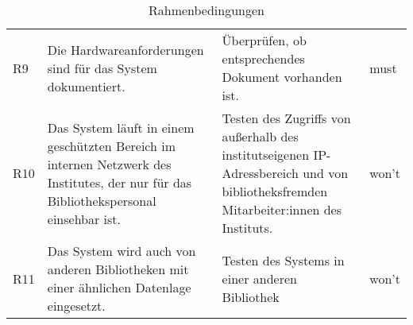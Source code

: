 \begin{table}[h]
\begin{adjustbox}{max width=\textwidth}
\begin{tabular}{lp{7.5cm}p{7.5cm}l}
        R9                                &Die Hardwareanforderungen sind für das System dokumentiert. & Überprüfen, ob entsprechendes Dokument vorhanden ist.  & must\\
        R10                               &Das System läuft in einem geschützten Bereich im internen Netzwerk des Institutes, der nur für das Bibliothekspersonal einsehbar ist. & Testen des Zugriffs von außerhalb des institutseigenen IP-Adressbereich und von bibliotheksfremden Mitarbeiter:innen des Instituts.& won't\\
        R11                               &Das System wird auch von anderen Bibliotheken mit einer ähnlichen Datenlage eingesetzt. & Testen des Systems in einer anderen Bibliothek & won't\\
       \bottomrule
    \end{tabular}
    \end{adjustbox}
    \caption{%
        Rahmenbedingungen
    }
    \label{tab:Rahmenbedingungen}
    \end{table}
\endgroup







